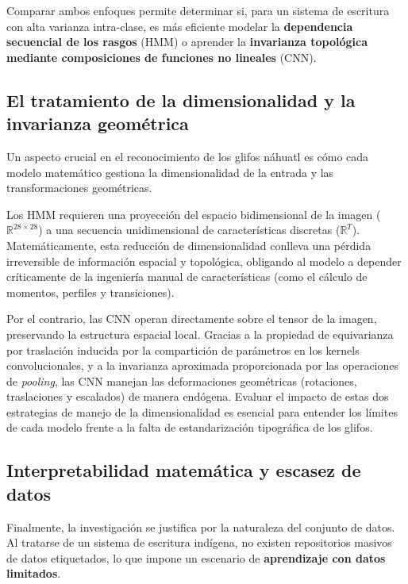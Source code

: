 \documentclass[
  spanish,
  us-letterpaper,
  DIV=11,
  numbers=noendperiod]{scrreprt}
\begin{document}
Comparar ambos enfoques permite determinar si, para un sistema de
escritura con alta varianza intra-clase, es más eficiente modelar la
\textbf{dependencia secuencial de los rasgos} (HMM) o aprender la
\textbf{invarianza topológica mediante composiciones de funciones no
lineales} (CNN).

\subsection{El tratamiento de la dimensionalidad y la invarianza
geométrica}\label{el-tratamiento-de-la-dimensionalidad-y-la-invarianza-geomuxe9trica}

Un aspecto crucial en el reconocimiento de los glifos náhuatl es cómo
cada modelo matemático gestiona la dimensionalidad de la entrada y las
transformaciones geométricas.

Los HMM requieren una proyección del espacio bidimensional de la imagen
(\(\mathbb{R}^{28 \times 28}\)) a una secuencia unidimensional de
características discretas (\(\mathbb{R}^T\)). Matemáticamente, esta
reducción de dimensionalidad conlleva una pérdida irreversible de
información espacial y topológica, obligando al modelo a depender
críticamente de la ingeniería manual de características (como el cálculo
de momentos, perfiles y transiciones).

Por el contrario, las CNN operan directamente sobre el tensor de la
imagen, preservando la estructura espacial local. Gracias a la propiedad
de equivarianza por traslación inducida por la compartición de
parámetros en los kernels convolucionales, y a la invarianza aproximada
proporcionada por las operaciones de \emph{pooling}, las CNN manejan las
deformaciones geométricas (rotaciones, traslaciones y escalados) de
manera endógena. Evaluar el impacto de estas dos estrategias de manejo
de la dimensionalidad es esencial para entender los límites de cada
modelo frente a la falta de estandarización tipográfica de los glifos.

\subsection{Interpretabilidad matemática y escasez de
datos}\label{interpretabilidad-matemuxe1tica-y-escasez-de-datos}

Finalmente, la investigación se justifica por la naturaleza del conjunto
de datos. Al tratarse de un sistema de escritura indígena, no existen
repositorios masivos de datos etiquetados, lo que impone un escenario de
\textbf{aprendizaje con datos limitados}.
\end{document}
